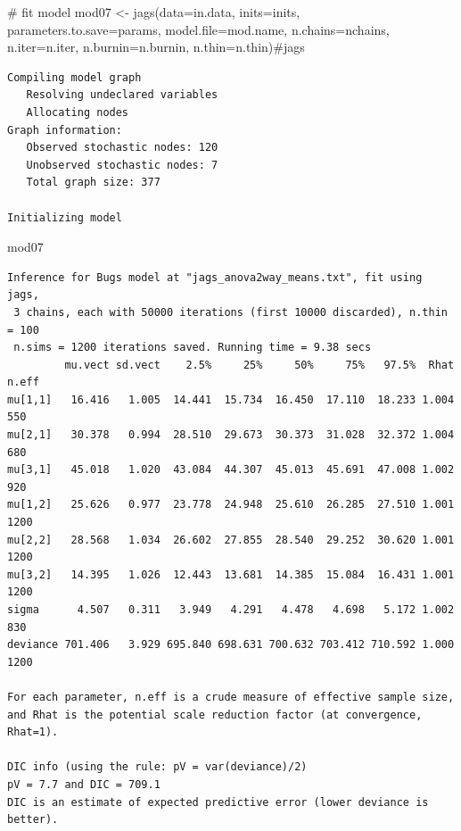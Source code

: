 \documentclass[
  13,
  letterpaper,
]{report}
\newenvironment{Shaded}{\begin{snugshade}}{\end{snugshade}}
\newcommand{\AttributeTok}[1]{\textcolor[rgb]{0.40,0.45,0.13}{#1}}
\newcommand{\CommentTok}[1]{\textcolor[rgb]{0.37,0.37,0.37}{#1}}
\newcommand{\FunctionTok}[1]{\textcolor[rgb]{0.28,0.35,0.67}{#1}}
\newcommand{\NormalTok}[1]{\textcolor[rgb]{0.00,0.23,0.31}{#1}}
\newcommand{\OtherTok}[1]{\textcolor[rgb]{0.00,0.23,0.31}{#1}}
\begin{document}
\begin{Shaded}
\begin{Highlighting}[]
\CommentTok{\# fit model}
\NormalTok{mod07 }\OtherTok{\textless{}{-}} \FunctionTok{jags}\NormalTok{(}\AttributeTok{data=}\NormalTok{in.data, }\AttributeTok{inits=}\NormalTok{inits,}
              \AttributeTok{parameters.to.save=}\NormalTok{params,}
              \AttributeTok{model.file=}\NormalTok{mod.name,}
              \AttributeTok{n.chains=}\NormalTok{nchains, }\AttributeTok{n.iter=}\NormalTok{n.iter,}
              \AttributeTok{n.burnin=}\NormalTok{n.burnin, }\AttributeTok{n.thin=}\NormalTok{n.thin)}\CommentTok{\#jags}
\end{Highlighting}
\end{Shaded}

\begin{verbatim}
Compiling model graph
   Resolving undeclared variables
   Allocating nodes
Graph information:
   Observed stochastic nodes: 120
   Unobserved stochastic nodes: 7
   Total graph size: 377

Initializing model
\end{verbatim}

\begin{Shaded}
\begin{Highlighting}[]
\NormalTok{mod07}
\end{Highlighting}
\end{Shaded}

\begin{verbatim}
Inference for Bugs model at "jags_anova2way_means.txt", fit using jags,
 3 chains, each with 50000 iterations (first 10000 discarded), n.thin = 100
 n.sims = 1200 iterations saved. Running time = 9.38 secs
         mu.vect sd.vect    2.5%     25%     50%     75%   97.5%  Rhat n.eff
mu[1,1]   16.416   1.005  14.441  15.734  16.450  17.110  18.233 1.004   550
mu[2,1]   30.378   0.994  28.510  29.673  30.373  31.028  32.372 1.004   680
mu[3,1]   45.018   1.020  43.084  44.307  45.013  45.691  47.008 1.002   920
mu[1,2]   25.626   0.977  23.778  24.948  25.610  26.285  27.510 1.001  1200
mu[2,2]   28.568   1.034  26.602  27.855  28.540  29.252  30.620 1.001  1200
mu[3,2]   14.395   1.026  12.443  13.681  14.385  15.084  16.431 1.001  1200
sigma      4.507   0.311   3.949   4.291   4.478   4.698   5.172 1.002   830
deviance 701.406   3.929 695.840 698.631 700.632 703.412 710.592 1.000  1200

For each parameter, n.eff is a crude measure of effective sample size,
and Rhat is the potential scale reduction factor (at convergence, Rhat=1).

DIC info (using the rule: pV = var(deviance)/2)
pV = 7.7 and DIC = 709.1
DIC is an estimate of expected predictive error (lower deviance is better).
\end{verbatim}
\end{document}
